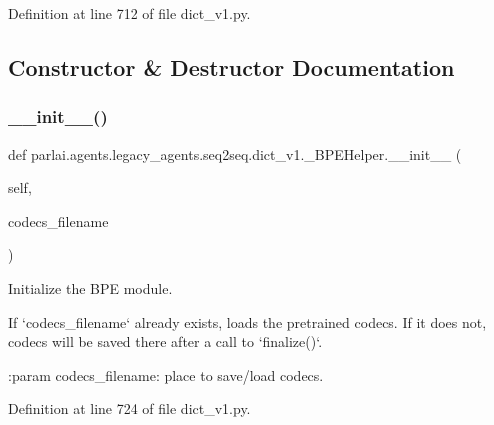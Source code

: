 Definition at line 712 of file dict\+\_\+v1.\+py.



\subsection{Constructor \& Destructor Documentation}
\mbox{\label{classparlai_1_1agents_1_1legacy__agents_1_1seq2seq_1_1dict__v1_1_1__BPEHelper_a95e6fa33247082a01355d39ee96fed39}} 
\subsubsection{\texorpdfstring{\+\_\+\+\_\+init\+\_\+\+\_\+()}{\_\_init\_\_()}}
{\footnotesize\ttfamily def parlai.\+agents.\+legacy\+\_\+agents.\+seq2seq.\+dict\+\_\+v1.\+\_\+\+B\+P\+E\+Helper.\+\_\+\+\_\+init\+\_\+\+\_\+ (\begin{DoxyParamCaption}\item[{}]{self,  }\item[{}]{codecs\+\_\+filename }\end{DoxyParamCaption})}

\begin{DoxyVerb}Initialize the BPE module.

If `codecs_filename` already exists, loads the pretrained codecs.
If it does not, codecs will be saved there after a call to `finalize()`.

:param codecs_filename: place to save/load codecs.
\end{DoxyVerb}
 

Definition at line 724 of file dict\+\_\+v1.\+py.


